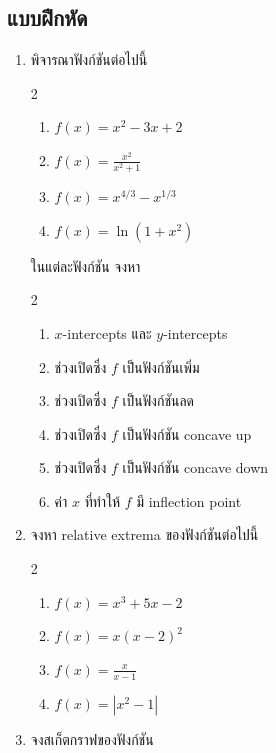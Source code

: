 \documentclass[
]{book}
\theoremstyle{definition}
\theoremstyle{definition}
\theoremstyle{definition}
\theoremstyle{definition}
\theoremstyle{remark}
\begin{document}
\subsection{แบบฝึกหัด}\label{uxe41uxe1auxe1auxe1duxe01uxe2buxe14-4}

\begin{enumerate}
\def\labelenumi{\arabic{enumi}.}
\item
  พิจารณาฟังก์ชันต่อไปนี้

  2

  \begin{enumerate}
  \def\labelenumii{\arabic{enumii}.}
  \item
    \(\displaystyle f(x) = x^2-3x+2\)
  \item
    \(\displaystyle f(x) = \frac{x^2}{x^2+1}\)
  \item
    \(\displaystyle f(x) = x^{4/3} - x^{1/3}\)
  \item
    \(\displaystyle f(x) = \ln(1+x^2)\)
  \end{enumerate}

  ในแต่ละฟังก์ชัน จงหา

  2

  \begin{enumerate}
  \def\labelenumii{\arabic{enumii}.}
  \item
    \(x\)-intercepts และ \(y\)-intercepts
  \item
    ช่วงเปิดซึ่ง \(f\) เป็นฟังก์ชันเพิ่ม
  \item
    ช่วงเปิดซึ่ง \(f\) เป็นฟังก์ชันลด
  \item
    ช่วงเปิดซึ่ง \(f\) เป็นฟังก์ชัน concave up
  \item
    ช่วงเปิดซึ่ง \(f\) เป็นฟังก์ชัน concave down
  \item
    ค่า \(x\) ที่ทำให้ \(f\) มี inflection point
  \end{enumerate}
\item
  จงหา relative extrema ของฟังก์ชันต่อไปนี้

  2

  \begin{enumerate}
  \def\labelenumii{\arabic{enumii}.}
  \item
    \(\displaystyle f(x) = x^3+5x-2\)
  \item
    \(\displaystyle f(x) = x(x-2)^2\)
  \item
    \(\displaystyle f(x) = \frac{x}{x-1}\)
  \item
    \(\displaystyle f(x) = |x^2-1|\)
  \end{enumerate}
\item
  จงสเก็ตกราฟของฟังก์ชัน


\end{enumerate}
\end{document}
